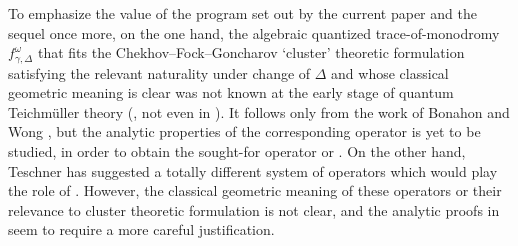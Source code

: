 \documentclass[pdftex]{sigma}
\numberwithin{equation}{section}
\theoremstyle{definition}
\begin{document}
To emphasize the value of the program set out by the current paper and the sequel \cite{sequel} once more, on the one hand, the algebraic quantized trace-of-monodromy $f^\omega_{\gamma,\Delta}$ that fits the Chekhov--Fock--Goncharov `cluster' theoretic formulation satisfying the relevant naturality under change of $\Delta$ and whose classical geometric meaning is clear was not known at the early stage of quantum Teichm\"uller theory (\cite{F97, CF}, not even in \cite{FG09}). It follows only from the work of Bonahon and Wong \cite{BW}, but the analytic properties of the corresponding operator  is yet to be studied, in order to obtain the sought-for operator  or . On the other hand, Teschner \cite{T} has suggested a totally different system of operators which would play the role of . However, the classical geometric meaning of these operators or their relevance to cluster theoretic formulation is not clear, and the analytic proofs in \cite{T} seem to require a more careful justification.
\end{document}
